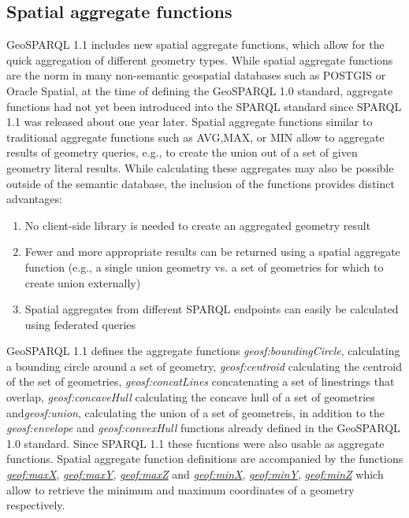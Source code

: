 \documentclass[runningheads]{llncs}
\begin{document}
\subsection{Spatial aggregate functions}
\label{sec:spatialaggregate}
GeoSPARQL 1.1 includes new spatial aggregate functions, which allow for the quick aggregation of different geometry types. While spatial aggregate functions are the norm in many non-semantic geospatial databases such as POSTGIS or Oracle Spatial, at the time of defining the GeoSPARQL 1.0 standard, aggregate functions had not yet been introduced into the SPARQL standard since SPARQL 1.1 \cite{w3c_sparql_working_group_sparql_2013} was released about one year later. Spatial aggregate functions similar to traditional aggregate functions such as AVG,MAX, or MIN allow to aggregate results of geometry queries, e.g., to create the union out of a set of given geometry literal results. While calculating these aggregates may also be possible outside of the semantic database, the inclusion of the functions provides distinct advantages:
\begin{enumerate}
    \item No client-side library is needed to create an aggregated geometry result
    \item Fewer and more appropriate results can be returned using a spatial aggregate function (e.g., a single union geometry vs. a set of geometries for which to create union externally)
    \item Spatial aggregates from different SPARQL endpoints can easily be calculated using federated queries 
\end{enumerate}
GeoSPARQL 1.1 defines the aggregate functions \emph{geosf:boundingCircle}, calculating a bounding circle around a set of geometry, \emph{geosf:centroid} calculating the centroid of the set of geometries, \emph{geosf:concatLines} concatenating a set of linestrings that overlap, \emph{geosf:concaveHull} calculating the concave hull of a set of geometries and\emph{geosf:union}, calculating the union of a set of geometreis, in addition to the \emph{geosf:envelope} and \emph{geosf:convexHull} functions already defined in the GeoSPARQL 1.0 standard. Since SPARQL 1.1 these fucntions were also usable as aggregate functions.
Spatial aggregate function definitions are accompanied by the functions \href{http://www.opengis.net/def/function/geosparql/maxX}{\emph{geof:maxX}}, \href{http://www.opengis.net/def/function/geosparql/maxY}{\emph{geof:maxY}}, \href{http://www.opengis.net/def/function/geosparql/maxZ}{\emph{geof:maxZ}} and \href{http://www.opengis.net/def/function/geosparql/minX}{\emph{geof:minX}}, \href{http://www.opengis.net/def/function/geosparql/minY}{\emph{geof:minY}}, \href{http://www.opengis.net/def/function/geosparql/minZ}{\emph{geof:minZ}} which allow to retrieve the minimum and maximum coordinates of a geometry respectively.
\end{document}
